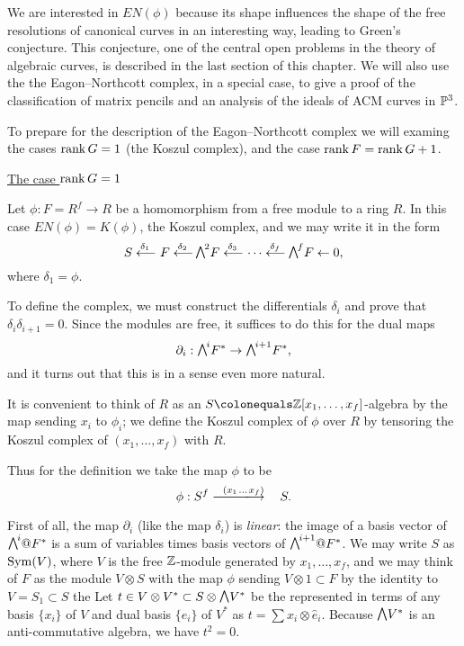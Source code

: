 We
are interested in $EN(\phi)$ because its shape
influences the shape of the free resolutions of canonical curves in an
interesting way,
leading to Green's conjecture. This conjecture, one of the central open
problems in the theory of algebraic curves, is described in the last
section of this chapter. We will also use the the Eagon--Northcott
complex, in a special case, to give a proof of the classification of
matrix pencils and an analysis of the ideals of ACM curves in $\mathbb P^{3}$.

To prepare for the description of the Eagon--Northcott complex we 
will examing the cases $\operatorname{rank} G = 1$ (the Koszul complex), and 
 the case $\operatorname{rank} F = \operatorname{rank} G + 1$.

\smallbreak
\noindent
\underline{The case $\operatorname{rank} G = 1$}
\smallbreak

Let $\phi:F = R^{f}\to R$ be a homomorphism from
a free module to a ring $R$. In this case $EN(\phi) = K(\phi)$,
the Koszul complex, and we may write it in the form
$$
S \luto{\,\delta_{1}} \!F \luto{\,\delta_{2}}\!\! \mwedge^{2}F
\luto{\,\delta_{3}} \!\cdots \luto{\,\delta_{f}}\!\!\mwedge^{f}F\leftarrow 0, 
$$
where $\delta_{1} = \phi$.

To define the complex, we must construct the differentials $\delta_{i}$
and prove that
$\delta_{i}\delta_{i+1} = 0$. Since the modules are free, it suffices
to do this for the
dual maps
$$
\partial_{i}: \mwedge^{i}F^{*} \to \mwedge^{i+1}F^{*},
$$
and it turns out that this is in a sense even more natural.

It is convenient to think of $R$ as an $S \colonequals  \ZZ[x_{1},\dots,
x_{f}]$-algebra by the map sending
$x_{i}$ to $\phi_{i}$; we  define the Koszul complex of $\phi$ over $R$
%
by tensoring
the Koszul complex of $(x_{1}, \dots, x_{f})$ with $R$.

Thus for the definition we take the map $\phi$ to be
$$
\phi: S^{f}\ruuuto {\ \
(x_{1} \,\dots \, x_{f})
} \hskip0.7em S.
$$

First of all, the map $\partial_{i}$ (like the map $\delta_{i}$) is
\emph{linear}: the image of a basis vector of $\mwedge^{i}@F^{*} $ is a
sum of variables times basis vectors
of $\mwedge^{i+1}@F^{*}$. We may write $S$ as $\operatorname{Sym}(V)$, where $V$ is the
free ${\mathbb Z}$-module generated by $x_{1}, \dots, x_{f}$, and we may think
of $F$ as the module $V\otimes S$ with the map
$\phi$ sending $V\otimes 1\subset F$ by the identity to $V = S_{1}\subset S$
\emdash the 
%
Let $t\in V\otimes V^{*}\subset S\otimes \mwedge \,V^{*}$ be the 
\index{trace}%
represented in terms of any basis $\{x_{i}\}$ of $V$
and dual basis $\{\hat e_{i}\}$ of $V^{*}$ as $t = \sum x_{i}\otimes
\hat e_{i}$. Because $\mwedge \,V^{*}$ is
an anti-commutative algebra, we have $t^{2} = 0$.

